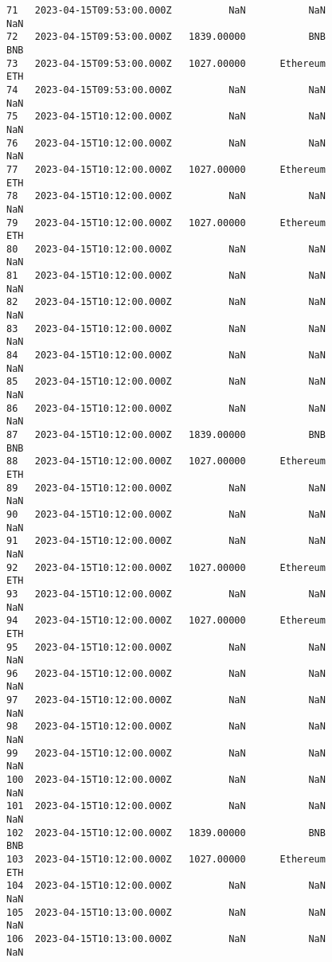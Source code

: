 \documentclass[11pt]{article}
\begin{document}
\begin{tcolorbox}[breakable, size=fbox, boxrule=.5pt, pad at break*=1mm, opacityfill=0]
\begin{Verbatim}[commandchars=\\\{\}]
71   2023-04-15T09:53:00.000Z          NaN           NaN             NaN
72   2023-04-15T09:53:00.000Z   1839.00000           BNB             BNB
73   2023-04-15T09:53:00.000Z   1027.00000      Ethereum             ETH
74   2023-04-15T09:53:00.000Z          NaN           NaN             NaN
75   2023-04-15T10:12:00.000Z          NaN           NaN             NaN
76   2023-04-15T10:12:00.000Z          NaN           NaN             NaN
77   2023-04-15T10:12:00.000Z   1027.00000      Ethereum             ETH
78   2023-04-15T10:12:00.000Z          NaN           NaN             NaN
79   2023-04-15T10:12:00.000Z   1027.00000      Ethereum             ETH
80   2023-04-15T10:12:00.000Z          NaN           NaN             NaN
81   2023-04-15T10:12:00.000Z          NaN           NaN             NaN
82   2023-04-15T10:12:00.000Z          NaN           NaN             NaN
83   2023-04-15T10:12:00.000Z          NaN           NaN             NaN
84   2023-04-15T10:12:00.000Z          NaN           NaN             NaN
85   2023-04-15T10:12:00.000Z          NaN           NaN             NaN
86   2023-04-15T10:12:00.000Z          NaN           NaN             NaN
87   2023-04-15T10:12:00.000Z   1839.00000           BNB             BNB
88   2023-04-15T10:12:00.000Z   1027.00000      Ethereum             ETH
89   2023-04-15T10:12:00.000Z          NaN           NaN             NaN
90   2023-04-15T10:12:00.000Z          NaN           NaN             NaN
91   2023-04-15T10:12:00.000Z          NaN           NaN             NaN
92   2023-04-15T10:12:00.000Z   1027.00000      Ethereum             ETH
93   2023-04-15T10:12:00.000Z          NaN           NaN             NaN
94   2023-04-15T10:12:00.000Z   1027.00000      Ethereum             ETH
95   2023-04-15T10:12:00.000Z          NaN           NaN             NaN
96   2023-04-15T10:12:00.000Z          NaN           NaN             NaN
97   2023-04-15T10:12:00.000Z          NaN           NaN             NaN
98   2023-04-15T10:12:00.000Z          NaN           NaN             NaN
99   2023-04-15T10:12:00.000Z          NaN           NaN             NaN
100  2023-04-15T10:12:00.000Z          NaN           NaN             NaN
101  2023-04-15T10:12:00.000Z          NaN           NaN             NaN
102  2023-04-15T10:12:00.000Z   1839.00000           BNB             BNB
103  2023-04-15T10:12:00.000Z   1027.00000      Ethereum             ETH
104  2023-04-15T10:12:00.000Z          NaN           NaN             NaN
105  2023-04-15T10:13:00.000Z          NaN           NaN             NaN
106  2023-04-15T10:13:00.000Z          NaN           NaN             NaN

\end{Verbatim}
\end{tcolorbox}
\end{document}
